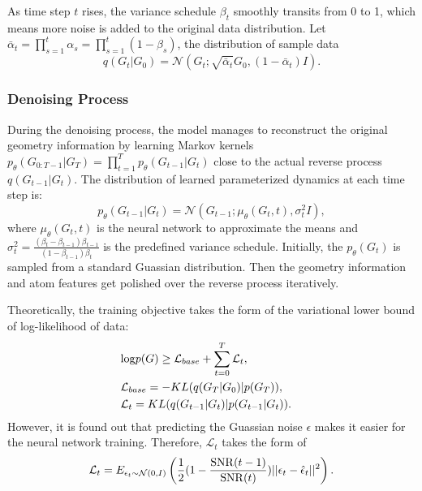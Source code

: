 \documentclass[letterpaper]{article} %
\begin{document}
As time step $t$ rises, the variance schedule $\beta_t$ smoothly transits from 0 to 1, which means more noise is added to the original data distribution. Let $\bar{\alpha}_t = \prod^t_{s=1} \alpha_s = \prod^t_{s=1}(1-\beta_s)$, the distribution of sample data
\begin{equation}
q(G_t|G_0) = \mathcal{N}(G_t; \sqrt{\bar{\alpha}_t} G_0, (1 - \bar{\alpha}_t) I).
\end{equation}

\subsubsection{Denoising Process}
During the denoising process, the model manages to reconstruct the original geometry information by learning Markov kernels $p_\theta(G_{0:T-1}| G_{T}) = \prod^T_{t=1} p_\theta(G_{t-1} | G_t)$ close to the actual reverse process $q(G_{t-1} | G_t)$. The distribution of learned parameterized dynamics at each time step is:
\begin{equation}
p_\theta(G_{t-1} | G_t) = \mathcal{N}(G_{t-1}; \mu_\theta(G_t, t), \sigma_t^2 I),
\end{equation}
where $\mu_\theta(G_t, t)$ is the neural network to approximate the means and $\sigma^2_t = \frac{(\beta_t - \beta_{t-1})\beta_{t-1}}{(1 - \beta_{t-1}) \beta_t}$ is the predefined variance schedule. Initially, the $p_\theta(G_t)$ is sampled from a standard Guassian distribution. Then the geometry information and atom features get polished over the reverse process iteratively.

Theoretically, the training objective takes the form of the variational lower bound of log-likelihood of data:
\begin{eqnarray}
&{\rm log}p(G) \geq \mathcal{L}_{base} + \sum_{t=0}^T \mathcal{L}_t,& \\
&\mathcal{L}_{base} = -KL(q(G_T|G_0)|p(G_T)),& \\
&\mathcal{L}_t = KL(q(G_{t-1}|G_t)|p(G_{t-1}|G_t)). &
\end{eqnarray}
However, it is found out that predicting the Guassian noise $\epsilon$ makes it easier for the neural network training. Therefore, $\mathcal{L}_t$ \cite{vaediff_21_kingma} takes the form of
\begin{equation}
\mathcal{L}_t = E_{\epsilon_t \sim \mathcal{N}(0, I)}\left(\frac{1}{2}(1- \frac{{\rm SNR}(t-1)}{{\rm SNR}(t)})||\epsilon_t - \hat{\epsilon}_t||^2\right).
\end{equation}
\end{document}
